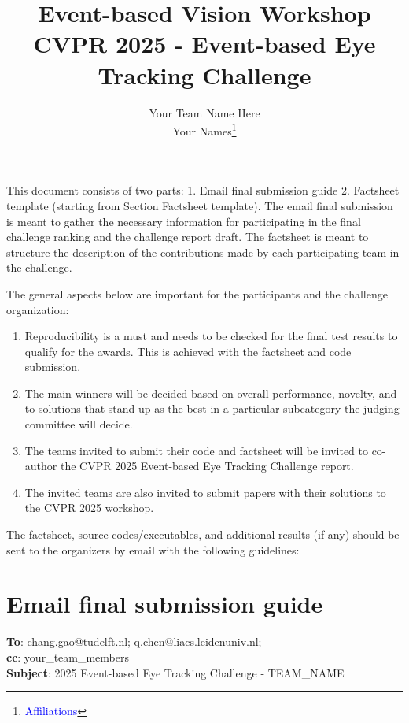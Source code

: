 \documentclass{article}
\title{Event-based Vision Workshop CVPR 2025 - Event-based Eye Tracking Challenge}
\author{Your Team Name Here\\
Your Names\thanks{\textcolor{blue}{Affiliations}}\\
}
\begin{document}
\maketitle

This document consists of two parts: 1. Email final submission guide 2. Factsheet template (starting from Section Factsheet template). The email final submission is meant to gather the necessary information for participating in the final challenge ranking and the challenge report draft. The factsheet is meant to structure the description of the contributions made by each participating team in the challenge.

The general aspects below are important for the participants and the challenge organization:
\begin{enumerate}
    \item Reproducibility is a must and needs to be checked for the final test results to qualify for the awards. This is achieved with the factsheet and code submission.
    
    \item The main winners will be decided based on overall performance, novelty, and to solutions that stand up as the best in a particular subcategory the judging committee will decide.
    
    \item The teams invited to submit their code and factsheet will be invited to co-author the CVPR 2025 Event-based Eye Tracking Challenge report. 
    
    \item The invited teams are also invited to submit papers with their solutions to the CVPR 2025 workshop.

\end{enumerate}

The factsheet, source codes/executables, and additional results (if any) should be sent to the organizers by email with the following guidelines:




\section*{Email final submission guide}

\textbf{To}: chang.gao@tudelft.nl; q.chen@liacs.leidenuniv.nl; \\
\textbf{cc}: your\_team\_members\\
\textbf{Subject}: 2025 Event-based Eye Tracking Challenge - TEAM\_NAME\\
\end{document}
